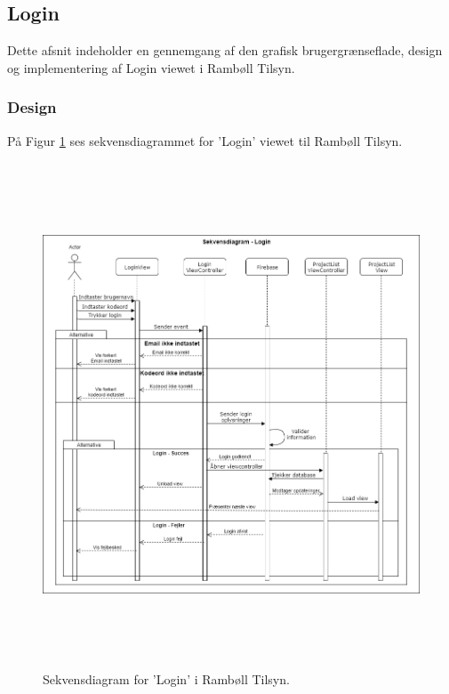\subsection{Login} \label{sec:Login}
Dette afsnit indeholder en gennemgang af den grafisk brugergrænseflade, design og implementering af Login viewet i Rambøll Tilsyn.

\subsubsection{Design}
På Figur \ref{fig:LoginSekvens} ses sekvensdiagrammet for 'Login' viewet til Rambøll Tilsyn.
\begin{figure}[H] %
	\centering
	\includegraphics[height=15cm, width=15cm]{../ArkitekturDesign/Design/Login/LoginSekvensDiagram}
	\caption{Sekvensdiagram for 'Login' i Rambøll Tilsyn.}
	\label{fig:LoginSekvens}
\end{figure}

\clearpage

